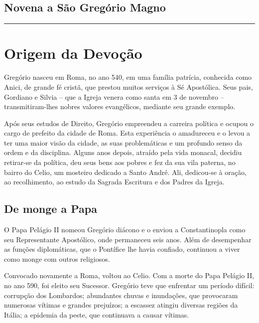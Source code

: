\documentclass[a4paper,14pt]{extarticle} \usepackage[utf8]{inputenc}
\begin{document}
\subsection*{Novena a São Gregório Magno}


\par\noindent\rule{\textwidth}{0.4pt}

\tableofcontents
\thispagestyle{empty}

\newpage

\section{Origem da Devoção}

Gregório nasceu em Roma, no ano 540, em uma família patrícia, conhecida como Anici, de grande fé cristã, que prestou muitos serviços à Sé Apostólica. Seus pais, Gordiano e Silvia – que a Igreja venera como santa em 3 de novembro – transmitiram-lhes nobres valores evangélicos, mediante seu grande exemplo.

Após seus estudos de Direito, Gregório empreendeu a carreira política e ocupou o cargo de prefeito da cidade de Roma. Esta experiência o amadureceu e o levou a ter uma maior visão da cidade, as suas problemáticas e um profundo senso da ordem e da disciplina. Alguns anos depois, atraído pela vida monacal, decidiu retirar-se da política, deu seus bens aos pobres e fez da sua vila paterna, no bairro do Celio, um mosteiro dedicado a Santo André. Ali, dedicou-se à oração, ao recolhimento, ao estudo da Sagrada Escritura e dos Padres da Igreja.

\subsection{De monge a Papa}

O Papa Pelágio II nomeou Gregório diácono e o enviou a Constantinopla como seu Representante Apostólico, onde permaneceu seis anos. Além de desempenhar as funções diplomáticas, que o Pontífice lhe havia confiado, continuou a viver como monge com outros religiosos.

Convocado novamente a Roma, voltou ao Celio. Com a morte do Papa Pelágio II, no ano 590, foi eleito seu Sucessor. Gregório teve que enfrentar um período difícil: corrupção dos Lombardos; abundantes chuvas e inundações, que provocaram numerosas vítimas e grandes prejuízos; a escassez atingiu diversas regiões da Itália; a epidemia da peste, que continuava a causar vítimas.
\end{document}
